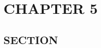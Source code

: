 \documentclass[../main/main]{subfiles}
\begin{document}
\chapter{CHAPTER 5}

\section{SECTION}

\printbibliography
\end{document}
